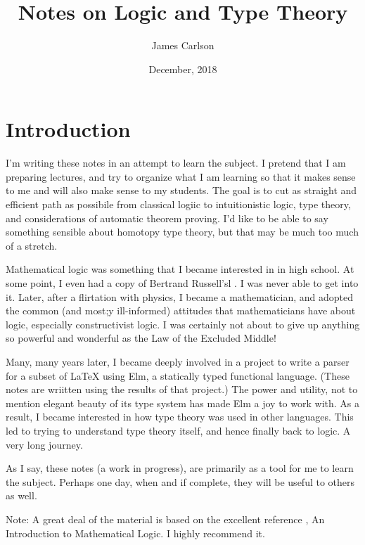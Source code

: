 \title{Notes on Logic and Type Theory}
\author{James Carlson}
\date{December, 2018}

\maketitle

\maintableofcontents



\section{Introduction}

I'm writing these notes in an attempt to learn the subject.  I pretend that I am preparing lectures, and try to organize what I am learning so that it makes sense to me and will also make sense to my students. The goal is to cut as straight and efficient path as possibile from classical logiic to intuitionistic logic, type theory, and considerations of automatic theorem proving.  I'd like to be able to say something sensible about homotopy type theory, but that may be much too much of a stretch.

Mathematical logic was something that I became interested in in high school.  At some point, I even had a copy of Bertrand Russell'sl .  I was never able to get into it.  Later, after a flirtation with physics, I became a mathematician, and adopted the common (and most;y ill-informed) attitudes that mathematicians have about logic, especially constructivist logic.  I was certainly not about to give up anything so powerful and wonderful as the Law of the Excluded Middle! 

Many, many years later, I became deeply involved in a project to write a parser for a subset of LaTeX using Elm, a statically typed functional language.  (These notes are wriitten using the results of that project.) The power and utility, not to mention elegant beauty of its type system has made Elm a joy to work with.  As a result,  I became interested in how type theory was used  in other languages. This led to trying to understand type theory itself, and hence finally back to logic. A very long journey.

As I say, these notes (a work in progress), are primarily as a tool for me to learn the subject.  Perhaps one day, when and if complete, they will be useful to others as well.


Note: A great deal of the material is based on the excellent reference \cite{RH}, An Introduction to Mathematical Logic. I highly recommend it.


